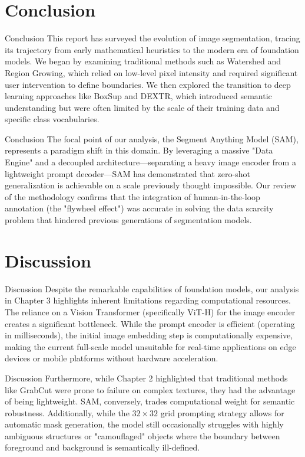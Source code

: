 \documentclass[11pt, aspectratio=169]{beamer}
\begin{document}
\section{Conclusion}

\begin{frame}{Conclusion}
	This report has surveyed the evolution of image segmentation, tracing its trajectory from early mathematical heuristics to the modern era of foundation models. We began by examining traditional methods such as Watershed and Region Growing, which relied on low-level pixel intensity and required significant user intervention to define boundaries. We then explored the transition to deep learning approaches like BoxSup and DEXTR, which introduced semantic understanding but were often limited by the scale of their training data and specific class vocabularies.
\end{frame}

\begin{frame}{Conclusion}
	The focal point of our analysis, the Segment Anything Model (SAM), represents a paradigm shift in this domain. By leveraging a massive "Data Engine" and a decoupled architecture—separating a heavy image encoder from a lightweight prompt decoder—SAM has demonstrated that zero-shot generalization is achievable on a scale previously thought impossible. Our review of the methodology confirms that the integration of human-in-the-loop annotation (the "flywheel effect") was accurate in solving the data scarcity problem that hindered previous generations of segmentation models.
\end{frame}

\section{Discussion}

\begin{frame}{Discussion}
	Despite the remarkable capabilities of foundation models, our analysis in Chapter 3 highlights inherent limitations regarding computational resources. The reliance on a Vision Transformer (specifically ViT-H) for the image encoder creates a significant bottleneck. While the prompt encoder is efficient (operating in milliseconds), the initial image embedding step is computationally expensive, making the current full-scale model unsuitable for real-time applications on edge devices or mobile platforms without hardware acceleration.
\end{frame}

\begin{frame}{Discussion}
	Furthermore, while Chapter 2 highlighted that traditional methods like GrabCut were prone to failure on complex textures, they had the advantage of being lightweight. SAM, conversely, trades computational weight for semantic robustness. Additionally, while the $32 \times 32$ grid prompting strategy allows for automatic mask generation, the model still occasionally struggles with highly ambiguous structures or "camouflaged" objects where the boundary between foreground and background is semantically ill-defined.
\end{frame}

%    
\end{document}
